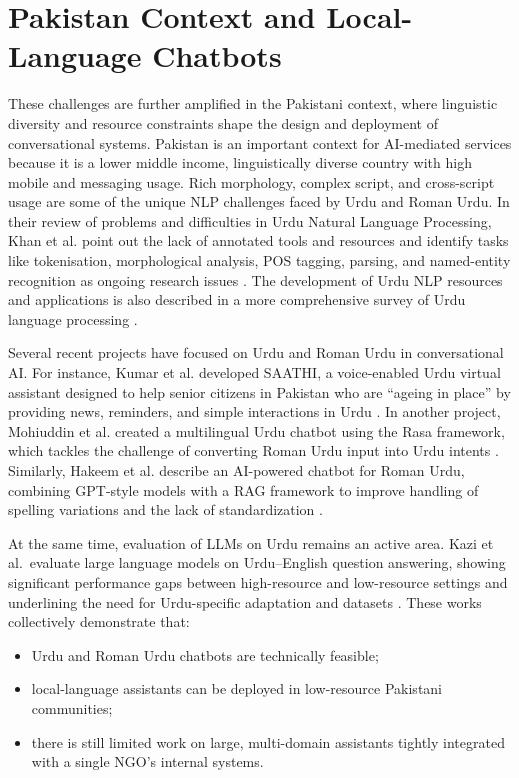 \section{Pakistan Context and Local-Language Chatbots}
These challenges are further amplified in the Pakistani context, where linguistic diversity and resource constraints shape the design and deployment of conversational systems. Pakistan is an important context for AI-mediated services because it is a lower middle income, linguistically diverse country with high mobile and messaging usage.  Rich morphology, complex script, and cross-script usage are some of the unique NLP challenges faced by Urdu and Roman Urdu.  In their review of problems and difficulties in Urdu Natural Language Processing, Khan et al. point out the lack of annotated tools and resources and identify tasks like tokenisation, morphological analysis, POS tagging, parsing, and named-entity recognition as ongoing research issues \cite{khan2020urdunlp}.  The development of Urdu NLP resources and applications is also described in a more comprehensive survey of Urdu language processing \cite{anwar2016survey}.

Several recent projects have focused on Urdu and Roman Urdu in conversational AI. For instance, Kumar et al. developed SAATHI, a voice-enabled Urdu virtual assistant designed to help senior citizens in Pakistan who are “ageing in place” by providing news, reminders, and simple interactions in Urdu \cite{kumar2022saathi}. In another project, Mohiuddin et al. created a multilingual Urdu chatbot using the Rasa framework, which tackles the challenge of converting Roman Urdu input into Urdu intents \cite{mohiuddin2023multilingual}. Similarly, Hakeem et al. describe an AI-powered chatbot for Roman Urdu, combining GPT-style models with a RAG framework to improve handling of spelling variations and the lack of standardization \cite{hakeem2025romanurdu}.

At the same time, evaluation of LLMs on Urdu remains an active area. Kazi et al.\ evaluate large language models on Urdu–English question answering, showing significant performance gaps between high-resource and low-resource settings and underlining the need for Urdu-specific adaptation and datasets \cite{kazi2025llmqa}. These works collectively demonstrate that:
\begin{itemize}\setlength{\itemsep}{0pt}
    \item Urdu and Roman Urdu chatbots are technically feasible;
    \item local-language assistants can be deployed in low-resource Pakistani communities;
    \item there is still limited work on large, multi-domain assistants tightly integrated with a single NGO’s internal systems.
\end{itemize}

